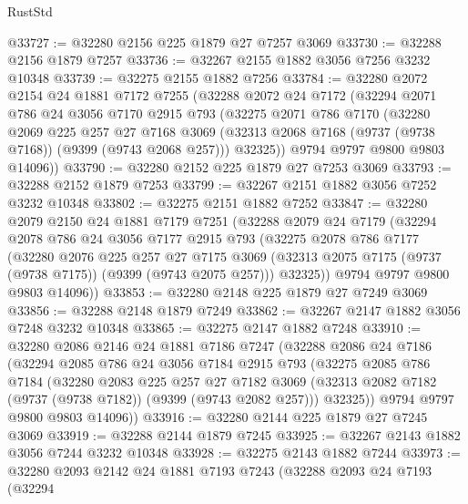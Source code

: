 \begin{lexlean}{RustStd}
\begin{coremodule}
@33727 := @32280 @2156 @225 @1879 @27 @7257 @3069
@33730 := @32288 @2156 @1879 @7257
@33736 := @32267 @2155 @1882 @3056 @7256 @3232 @10348
@33739 := @32275 @2155 @1882 @7256
@33784 := @32280
    @2072
    @2154
    @24
    @1881
    @7172
    @7255
    (@32288
      @2072
      @24
      @7172
      (@32294
        @2071
        @786
        @24
        @3056
        @7170
        @2915
        @793
        (@32275
          @2071
          @786
          @7170
          (@32280
            @2069
            @225
            @257
            @27
            @7168
            @3069
            (@32313 @2068 @7168 (@9737 (@9738 @7168)) (@9399 (@9743 @2068 @257)))
            @32325))
        @9794
        @9797
        @9800
        @9803
        @14096))
@33790 := @32280 @2152 @225 @1879 @27 @7253 @3069
@33793 := @32288 @2152 @1879 @7253
@33799 := @32267 @2151 @1882 @3056 @7252 @3232 @10348
@33802 := @32275 @2151 @1882 @7252
@33847 := @32280
    @2079
    @2150
    @24
    @1881
    @7179
    @7251
    (@32288
      @2079
      @24
      @7179
      (@32294
        @2078
        @786
        @24
        @3056
        @7177
        @2915
        @793
        (@32275
          @2078
          @786
          @7177
          (@32280
            @2076
            @225
            @257
            @27
            @7175
            @3069
            (@32313 @2075 @7175 (@9737 (@9738 @7175)) (@9399 (@9743 @2075 @257)))
            @32325))
        @9794
        @9797
        @9800
        @9803
        @14096))
@33853 := @32280 @2148 @225 @1879 @27 @7249 @3069
@33856 := @32288 @2148 @1879 @7249
@33862 := @32267 @2147 @1882 @3056 @7248 @3232 @10348
@33865 := @32275 @2147 @1882 @7248
@33910 := @32280
    @2086
    @2146
    @24
    @1881
    @7186
    @7247
    (@32288
      @2086
      @24
      @7186
      (@32294
        @2085
        @786
        @24
        @3056
        @7184
        @2915
        @793
        (@32275
          @2085
          @786
          @7184
          (@32280
            @2083
            @225
            @257
            @27
            @7182
            @3069
            (@32313 @2082 @7182 (@9737 (@9738 @7182)) (@9399 (@9743 @2082 @257)))
            @32325))
        @9794
        @9797
        @9800
        @9803
        @14096))
@33916 := @32280 @2144 @225 @1879 @27 @7245 @3069
@33919 := @32288 @2144 @1879 @7245
@33925 := @32267 @2143 @1882 @3056 @7244 @3232 @10348
@33928 := @32275 @2143 @1882 @7244
@33973 := @32280
    @2093
    @2142
    @24
    @1881
    @7193
    @7243
    (@32288
      @2093
      @24
      @7193
      (@32294

\end{coremodule}
\end{lexlean}

